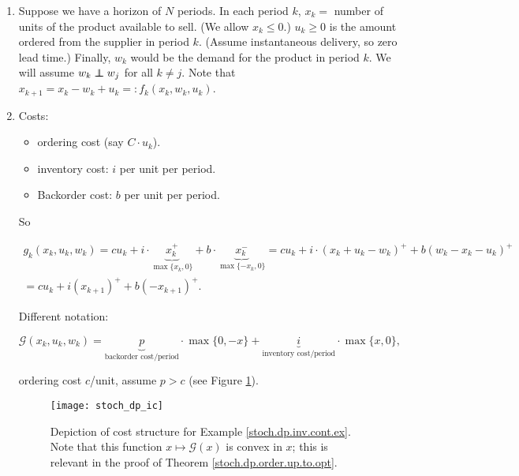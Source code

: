 \begin{example}\label{stoch.dp.inv.cont.ex}

\begin{enumerate}

\item

Suppose we have a horizon of \(N\) periods. In each period \(k\), \(x_k = \) number of units of the product available to sell. (We allow \(x_k \leq 0\).) \(u_k \geq 0\) is the amount ordered from the supplier in period \(k\). (Assume instantaneous delivery, so zero lead time.) Finally, \(w_k\) would be the demand for the product in period \(k\). We will assume \(w_k \indep w_j\) for all \(k \neq j\). Note that \(x_{k+1} = x_k - w_k + u_k =: f_k(x_k, w_k, u_k)\). 

\item Costs:

\begin{itemize}

\item ordering cost (say \(C \cdot u_k\)).

\item inventory cost: \(i \) per unit per period.

\item Backorder cost: \(b\) per unit per period.

\end{itemize}

So 

\begin{multline*}
g_k(x_k, u_k, w_k) = c u_k + i \cdot \underbrace{x_k^{+}}_{\max\{x_k, 0\}} + b \cdot \underbrace{x_k^{-}}_{\max\{-x_k, 0\}} =  c u_k + i \cdot (x_k + u_k - w_k)^+ + b(w_k - x_k - u_k)^+ 
\\ = c u_k + i (x_{k+1})^+ + b(-x_{k+1})^+.
\end{multline*}

Different notation:

\[
\mathcal{G}(x_k, u_k, w_k) = \underbrace{p}_{\text{backorder cost/period}} \cdot \max\{0, -x\} +  \underbrace{i}_{\text{inventory cost/period}} \cdot \max\{x, 0\},
\]

ordering cost \(c\)/unit, assume \(p > c\) (see Figure \ref{stoch_dp_ic_fig}). 

\begin{figure}[htbp]
\begin{center}
\texttt{[image: stoch\_dp\_ic]}
\caption{Depiction of cost structure for Example \ref{stoch.dp.inv.cont.ex}. Note that this function \(x \mapsto \mathcal{G}(x)\) is convex in \(x\); this is relevant in the proof of Theorem \ref{stoch.dp.order.up.to.opt}.}
\label{stoch_dp_ic_fig}
\end{center}
\end{figure}



\end{enumerate}
\end{example}
